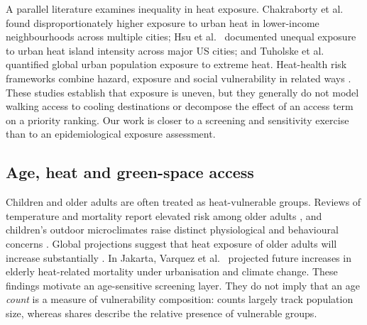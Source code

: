\documentclass[times,twoside]{_Templates/MultiTargetManuscript}
\begin{document}
A parallel literature examines inequality in heat exposure. Chakraborty et al.\
\citep{chakraborty2019} found disproportionately higher exposure to urban heat
in lower-income neighbourhoods across multiple cities; Hsu et al.\
\citep{hsu2021} documented unequal exposure to urban heat island intensity across
major US cities; and Tuholske et al.\ \citep{tuholske2021} quantified global
urban population exposure to extreme heat. Heat-health risk frameworks combine
hazard, exposure and social vulnerability in related ways \citep{dong2020}.
These studies establish that exposure is uneven, but they generally do not model
walking access to cooling destinations or decompose the effect of an access term
on a priority ranking. Our work is closer to a screening and sensitivity
exercise than to an epidemiological exposure assessment.

\subsection{Age, heat and green-space access}

Children and older adults are often treated as heat-vulnerable groups. Reviews
of temperature and mortality report elevated risk among older adults
\citep{basu2009,astrom2011}, and children's outdoor microclimates raise distinct
physiological and behavioural concerns \citep{vanos2015}. Global projections
suggest that heat exposure of older adults will increase substantially
\citep{falchetta2024}. In Jakarta, Varquez et al.\ \citep{varquez2020} projected
future increases in elderly heat-related mortality under urbanisation and
climate change. These findings motivate an age-sensitive screening layer. They
do not imply that an age \emph{count} is a measure of vulnerability composition:
counts largely track population size, whereas shares describe the relative
presence of vulnerable groups.
\end{document}
